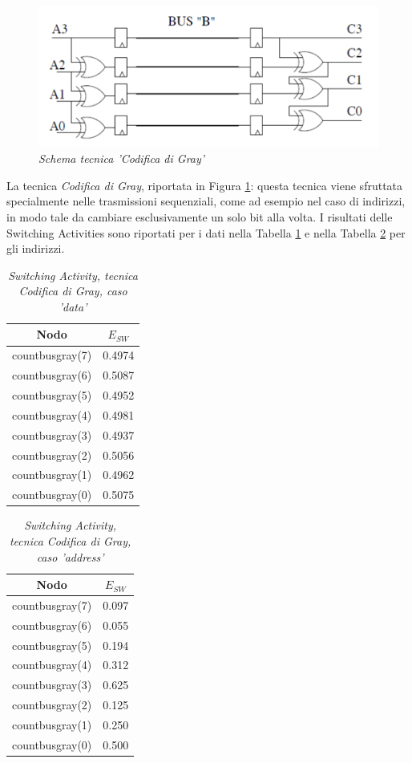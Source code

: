 \begin{figure}[!htb]
	\centering
	\includegraphics[scale=1]{immagini/gray}
	\caption{\textit{Schema tecnica 'Codifica di Gray'}}
	\label{gray}
\end{figure}
\newpage
\noindent La tecnica \textit{Codifica di Gray}, riportata in Figura \ref{gray}: questa tecnica viene sfruttata specialmente nelle trasmissioni sequenziali, come ad esempio nel caso di indirizzi, in modo tale da cambiare esclusivamente un solo bit alla volta. I risultati delle Switching Activities sono riportati per i dati nella Tabella \ref{Tab7} e nella Tabella \ref{Tab8} per gli indirizzi. \\
\begin{table}[!h]\footnotesize
	\centering
	\begin{tabular}{|c|c|}
		\hline
		\textbf{Nodo} & \textbf{$E_{SW}$}\\
		\hline
		countbusgray(7) & 0.4974\\
		countbusgray(6) & 0.5087\\
		countbusgray(5) & 0.4952\\
		countbusgray(4) & 0.4981\\
		countbusgray(3) & 0.4937\\
		countbusgray(2) & 0.5056\\
		countbusgray(1) & 0.4962\\
		countbusgray(0) & 0.5075\\
		\hline
	\end{tabular}
	\caption{\textit{Switching Activity, tecnica Codifica di Gray, caso 'data'}}
	\label{Tab7}
\end{table}
\begin{table}[!h]\footnotesize
	\centering
	\begin{tabular}{|c|c|}
		\hline
		\textbf{Nodo} & \textbf{$E_{SW}$}\\
		\hline
		countbusgray(7) & 0.097\\
		countbusgray(6) & 0.055\\
		countbusgray(5) & 0.194\\
		countbusgray(4) & 0.312\\
		countbusgray(3) & 0.625\\
		countbusgray(2) & 0.125\\
		countbusgray(1) & 0.250\\
		countbusgray(0) & 0.500\\
		\hline
	\end{tabular}
	\caption{\textit{Switching Activity, tecnica Codifica di Gray, caso 'address'}}
	\label{Tab8}
\end{table}

